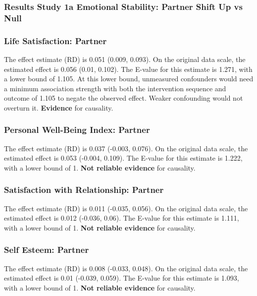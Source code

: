 \documentclass[
  singlecolumn]{article}
\begin{document}
\newpage{}

\subsubsection{Results Study 1a Emotional Stability: Partner Shift Up vs
Null}\label{results-study-1a-emotional-stability-partner-shift-up-vs-null}

\subsubsection{Life Satisfaction:
Partner}\label{life-satisfaction-partner-3}

The effect estimate (RD) is 0.051 (0.009, 0.093). On the original data
scale, the estimated effect is 0.056 (0.01, 0.102). The E-value for this
estimate is 1.271, with a lower bound of 1.105. At this lower bound,
unmeasured confounders would need a minimum association strength with
both the intervention sequence and outcome of 1.105 to negate the
observed effect. Weaker confounding would not overturn it.
\textbf{Evidence} for causality.

\subsubsection{Personal Well-Being Index:
Partner}\label{personal-well-being-index-partner-3}

The effect estimate (RD) is 0.037 (-0.003, 0.076). On the original data
scale, the estimated effect is 0.053 (-0.004, 0.109). The E-value for
this estimate is 1.222, with a lower bound of 1. \textbf{Not reliable
evidence} for causality.

\subsubsection{Satisfaction with Relationship:
Partner}\label{satisfaction-with-relationship-partner-3}

The effect estimate (RD) is 0.011 (-0.035, 0.056). On the original data
scale, the estimated effect is 0.012 (-0.036, 0.06). The E-value for
this estimate is 1.111, with a lower bound of 1. \textbf{Not reliable
evidence} for causality.

\subsubsection{Self Esteem: Partner}\label{self-esteem-partner-3}

The effect estimate (RD) is 0.008 (-0.033, 0.048). On the original data
scale, the estimated effect is 0.01 (-0.039, 0.059). The E-value for
this estimate is 1.093, with a lower bound of 1. \textbf{Not reliable
evidence} for causality.
\end{document}
